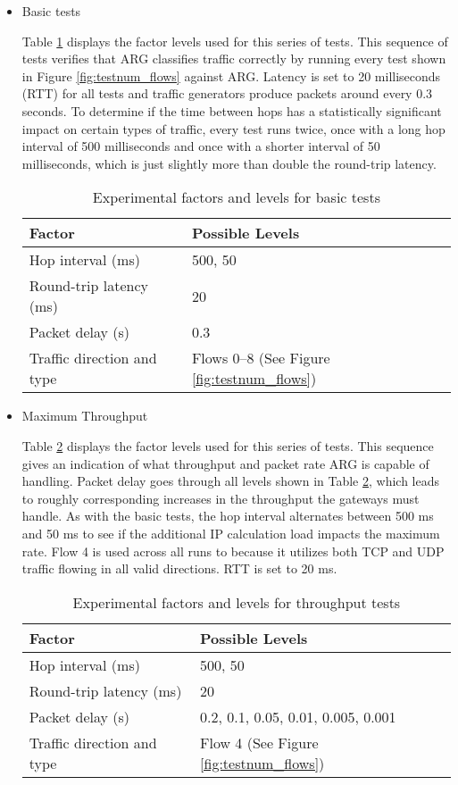 \begin{itemize}
	\item Basic tests
	\par Table \ref{tbl:basic_factors} displays the factor levels used for this series of tests. This sequence of tests verifies that \ac{ARG} classifies traffic correctly by running every test shown in Figure \ref{fig:testnum_flows} against \ac{ARG}. Latency is set to 20 milliseconds (\ac{RTT}) for all tests and traffic generators produce packets around every 0.3 seconds. To determine if the time between hops has a statistically significant impact on certain types of traffic, every test runs twice, once with a long hop interval of 500 milliseconds and once with a shorter interval of 50 milliseconds, which is just slightly more than double the round-trip latency.

\begin{table}
\caption{Experimental factors and levels for basic tests}
\label{tbl:basic_factors}
\centering
\begin{tabular}{l|l}
\textbf{Factor} & \textbf{Possible Levels} \\
\hline
Hop interval (ms) & 500, 50\\
Round-trip latency (ms) & 20\\
Packet delay (s) & 0.3\\
Traffic direction and type & Flows 0--8 (See Figure \ref{fig:testnum_flows})
\end{tabular}
\end{table}

	\item Maximum Throughput
	\par Table \ref{tbl:throughput_factors} displays the factor levels used for this series of tests. This sequence gives an indication of what throughput and packet rate \ac{ARG} is capable of handling. Packet delay goes through all levels shown in Table \ref{tbl:throughput_factors}, which leads to roughly corresponding increases in the throughput the gateways must handle. As with the basic tests, the hop interval alternates between 500 ms and 50 ms to see if the additional \ac{IP} calculation load impacts the maximum rate. Flow 4 is used across all runs to because it utilizes both \ac{TCP} and \ac{UDP} traffic flowing in all valid directions. \ac{RTT} is set to 20 ms.

\begin{table}
\caption{Experimental factors and levels for throughput tests}
\label{tbl:throughput_factors}
\centering
\begin{tabular}{l|l}
\textbf{Factor} & \textbf{Possible Levels} \\
\hline
Hop interval (ms) & 500, 50\\
Round-trip latency (ms) & 20\\
Packet delay (s) & 0.2, 0.1, 0.05, 0.01, 0.005, 0.001\\
Traffic direction and type & Flow 4 (See Figure \ref{fig:testnum_flows})
\end{tabular}
\end{table}


\end{itemize}
